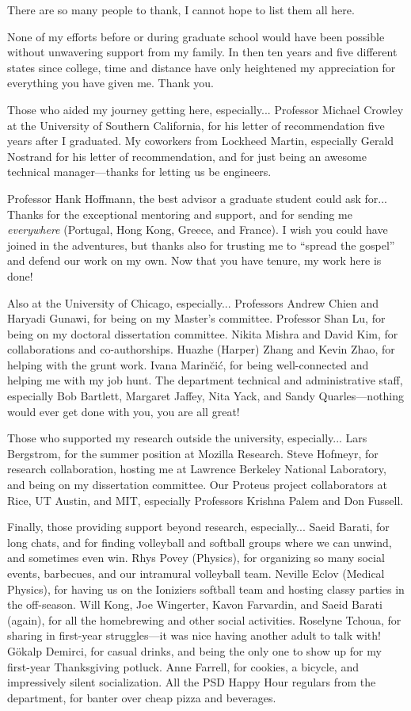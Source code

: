 There are so many people to thank, I cannot hope to list them all here.

None of my efforts before or during graduate school would have been possible without unwavering support from my family.
In then ten years and five different states since college, time and distance have only heightened my appreciation for everything you have given me.
Thank you.

Those who aided my journey getting here, especially...
Professor Michael Crowley at the University of Southern California, for his letter of recommendation five years after I graduated.
My coworkers from Lockheed Martin, especially Gerald Nostrand for his letter of recommendation, and for just being an awesome technical manager---thanks for letting us be engineers.

Professor Hank Hoffmann, the best advisor a graduate student could ask for...
Thanks for the exceptional mentoring and support, and for sending me \emph{everywhere} (\eg Portugal, Hong Kong, Greece, and France).
I wish you could have joined in the adventures, but thanks also for trusting me to ``spread the gospel'' and defend our work on my own.
Now that you have tenure, my work here is done!

Also at the University of Chicago, especially...
Professors Andrew Chien and Haryadi Gunawi, for being on my Master's committee.
Professor Shan Lu, for being on my doctoral dissertation committee.
Nikita Mishra and David Kim, for collaborations and co-authorships.
Huazhe (Harper) Zhang and Kevin Zhao, for helping with the grunt work.
Ivana Marin{\u c}i{\'c}, for being well-connected and helping me with my job hunt.
The department technical and administrative staff, especially Bob Bartlett, Margaret Jaffey, Nita Yack, and Sandy Quarles---nothing would ever get done with you, you are all great!

Those who supported my research outside the university, especially...
Lars Bergstrom, for the summer position at Mozilla Research.
Steve Hofmeyr, for research collaboration, hosting me at Lawrence Berkeley National Laboratory, and being on my dissertation committee.
Our Proteus project collaborators at Rice, UT Austin, and MIT, especially Professors Krishna Palem and Don Fussell.

Finally, those providing support beyond research, especially...
Saeid Barati, for long chats, and for finding volleyball and softball groups where we can unwind, and sometimes even win.
Rhys Povey (Physics), for organizing so many social events, barbecues, and our intramural volleyball team.
Neville Eclov (Medical Physics), for having us on the Ioniziers softball team and hosting classy parties in the off-season.
Will Kong, Joe Wingerter, Kavon Farvardin, and Saeid Barati (again), for all the homebrewing and other social activities.
Roselyne Tchoua, for sharing in first-year struggles---it was nice having another adult to talk with!
G{\"o}kalp Demirci, for casual drinks, and being the only one to show up for my first-year Thanksgiving potluck.
Anne Farrell, for cookies, a bicycle, and impressively silent socialization.
All the PSD Happy Hour regulars from the department, for banter over cheap pizza and beverages.

